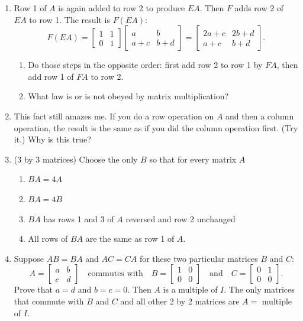 \documentclass[14pt, a4paper]{article}
\begin{document}
\begin{enumerate}
    \item Row 1 of $A$ is again added to row 2 to produce $EA$. Then $F$ adds row 2 of $EA$ to row 1. The result is $F(EA)$:
          \[
              F(EA) = \begin{bmatrix} 1 & 1 \\ 0 & 1 \end{bmatrix}
              \begin{bmatrix} a & b \\ a+c & b+d \end{bmatrix}
              = \begin{bmatrix} 2a+c & 2b+d \\ a+c & b+d \end{bmatrix}.
          \]
          \begin{enumerate}
              \item Do those steps in the opposite order: first add row 2 to row 1 by $FA$, then add row 1 of $FA$ to row 2.
              \item What law is or is not obeyed by matrix multiplication?
          \end{enumerate}

    \item This fact still amazes me. If you do a row operation on $A$ and then a column operation, the result is the same as if you did the column operation first. (Try it.) Why is this true?

    \item (3 by 3 matrices) Choose the only $B$ so that for every matrix $A$
          \begin{enumerate}
              \item $BA = 4A$
              \item $BA = 4B$
              \item $BA$ has rows 1 and 3 of $A$ reversed and row 2 unchanged
              \item All rows of $BA$ are the same as row 1 of $A$.
          \end{enumerate}

    \item Suppose $AB = BA$ and $AC = CA$ for these two particular matrices $B$ and $C$:
          \[
              A = \begin{bmatrix} a & b \\ c & d \end{bmatrix}
              \quad\text{commutes with}\quad
              B = \begin{bmatrix} 1 & 0 \\ 0 & 0 \end{bmatrix}
              \quad\text{and}\quad
              C = \begin{bmatrix} 0 & 1 \\ 0 & 0 \end{bmatrix}.
          \]
          Prove that $a = d$ and $b = c = 0$. Then $A$ is a multiple of $I$. The only matrices that commute with $B$ and $C$ and all other 2 by 2 matrices are $A =$ multiple of $I$.


\end{enumerate}
\end{document}
